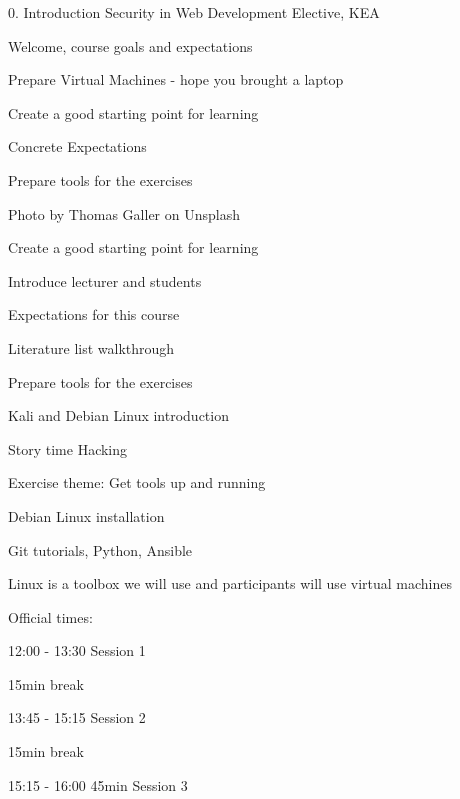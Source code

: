 \documentclass[Screen16to9,17pt]{foils}
\begin{document}
\mytitlepage
{0. Introduction}
{Security in Web Development Elective, KEA}


\hlkprofiluk



\begin{list2}
\item Welcome, course goals and expectations
\item Prepare Virtual Machines - hope you brought a laptop
\item Create a good starting point for learning
\item Concrete Expectations
\item Prepare tools for the exercises
\end{list2}

Photo by Thomas Galler on Unsplash


\begin{list2}
\item Create a good starting point for learning
\item Introduce lecturer and students
\item Expectations for this course
\item Literature list walkthrough
\item Prepare tools for the exercises
\item Kali and Debian Linux introduction
\item Story time Hacking
\end{list2}

Exercise theme: Get tools up and running
\begin{list2}
\item Debian Linux installation
\item Git tutorials, Python, Ansible
\end{list2}
Linux is a toolbox we will use and participants will use virtual machines



Official times:
\begin{list2}
\item 12:00 - 13:30 Session 1\\

\item 15min break\\

\item 13:45 - 15:15 Session 2\\

\item 15min break\\

\item 15:15 - 16:00 45min Session 3\\
\end{list2}
\end{document}
